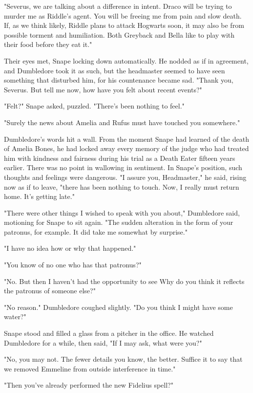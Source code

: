 "Severus, we are talking about a difference in intent. Draco will be trying to murder me as Riddle's agent. You will be freeing me from pain and slow death. If, as we think likely, Riddle plans to attack Hogwarts soon, it may also be from possible torment and humiliation. Both Greyback and Bella like to play with their food before they eat it."

Their eyes met, Snape locking down automatically. He nodded as if in agreement, and Dumbledore took it as such, but the headmaster seemed to have seen something that disturbed him, for his countenance became sad. "Thank you, Severus. But tell me now, how have you felt about recent events?"

"Felt?" Snape asked, puzzled. "There's been nothing to feel."

"Surely the news about Amelia and Rufus must have touched you somewhere."

Dumbledore's words hit a wall. From the moment Snape had learned of the death of Amelia Bones, he had locked away every memory of the judge who had treated him with kindness and fairness during his trial as a Death Eater fifteen years earlier. There was no point in wallowing in sentiment. In Snape's position, such thoughts and feelings were dangerous. "I assure you, Headmaster," he said, rising now as if to leave, "there has been nothing to touch. Now, I really must return home. It's getting late."

"There were other things I wished to speak with you about," Dumbledore said, motioning for Snape to sit again. "The sudden alteration in the form of your patronus, for example. It did take me somewhat by surprise."

"I have no idea how or why that happened."

"You know of no one who has that patronus?"

"No. But then I haven't had the opportunity to see{\el} Why do you think it reflects the patronus of someone else?"

"No reason." Dumbledore coughed slightly. "Do you think I might have some water?"

Snape stood and filled a glass from a pitcher in the office. He watched Dumbledore for a while, then said, "If I may ask, what were you{\el}?"

"No, you may not. The fewer details you know, the better. Suffice it to say that we removed Emmeline from outside interference in time."

"Then you've already performed the new Fidelius spell?"

